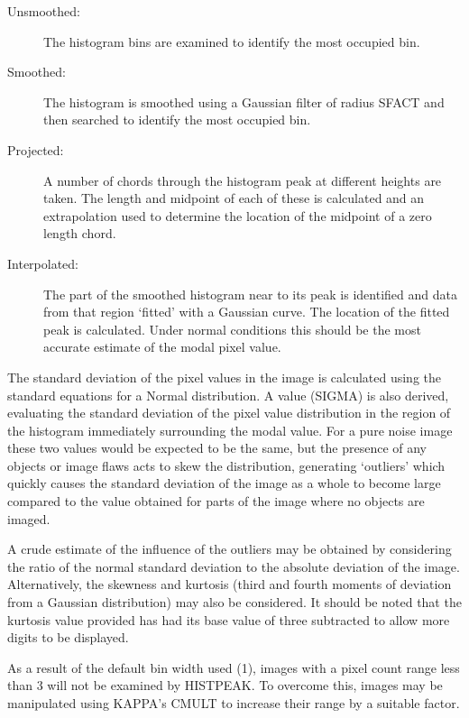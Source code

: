 \documentclass[twoside,11pt]{article}
\newcommand{\xref}[3]{#1}
\begin{document}
\begin{description}
\item[Unsmoothed:]
               The histogram bins are examined to identify the most
               occupied bin.
\item[Smoothed:]
               The histogram is smoothed using a Gaussian filter of radius
               SFACT and then searched to identify the most occupied bin.
\item[Projected:]
               A number of chords through the histogram peak at different
               heights are taken. The length and midpoint of each of these is
               calculated and an extrapolation used to determine the
               location of the midpoint of a zero length chord.
\item[Interpolated:]
               The part of the smoothed histogram near to its peak is
               identified and data from that region `fitted' with a
               Gaussian curve. The location of the fitted peak is
               calculated. Under normal conditions this should be
               the most accurate estimate of the modal pixel value.
\end{description}

The standard deviation of the pixel values in the image is
calculated using the standard equations for a Normal distribution.
A value (SIGMA) is also derived, evaluating the standard deviation of the
pixel value distribution in the region of the histogram immediately
surrounding the
modal value. For a pure noise image these two values would be expected
to be the same, but the presence of any objects or image flaws acts to
skew the distribution, generating `outliers' which quickly causes the
standard deviation of the image as a whole to become large compared to
the value obtained for parts of the image where no objects are imaged.

A crude estimate of the influence of the outliers may be obtained by
considering the ratio of the normal standard deviation to the absolute
deviation of the image. Alternatively, the skewness and kurtosis (third
and fourth moments of deviation from a Gaussian distribution) may also be
considered. It should be noted that the kurtosis value provided
has had its base value of three subtracted to allow more digits to be
displayed.

As a result of the default bin width used (1), images with a pixel count range
less than 3 will not be examined by HISTPEAK. To overcome this, images may be
manipulated using \xref{KAPPA}{sun95}{}'s CMULT to increase their range by a suitable factor.
\end{document}
